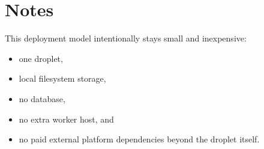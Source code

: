 \documentclass[conference]{IEEEtran}
\begin{document}
\section{Notes}
This deployment model intentionally stays small and inexpensive:
\begin{itemize}[leftmargin=1.5em]
    \item one droplet,
    \item local filesystem storage,
    \item no database,
    \item no extra worker host, and
    \item no paid external platform dependencies beyond the droplet itself.
\end{itemize}
\end{document}
